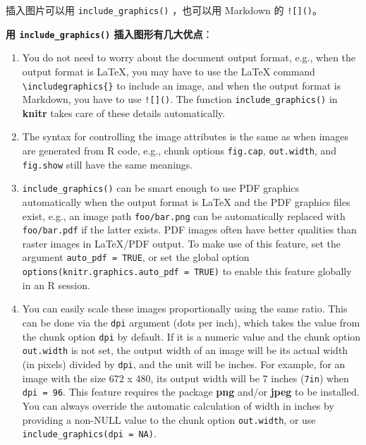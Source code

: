 \documentclass[]{article}
\providecommand{\tightlist}{%
  \setlength{\itemsep}{0pt}\setlength{\parskip}{0pt}}
\begin{document}
插入图片可以用 \texttt{include\_graphics()} ，也可以用 Markdown 的
\texttt{!{[}{]}()}。

\textbf{用 \texttt{include\_graphics()} 插入图形有几大优点}：

\begin{enumerate}
\def\labelenumi{\arabic{enumi}.}
\tightlist
\item
  You do not need to worry about the document output format, e.g., when
  the output format is LaTeX, you may have to use the LaTeX command
  \texttt{\textbackslash{}includegraphics\{\}} to include an image, and
  when the output format is Markdown, you have to use
  \texttt{!{[}{]}()}. The function \texttt{include\_graphics()} in
  \textbf{knitr} takes care of these details automatically.
\item
  The syntax for controlling the image attributes is the same as when
  images are generated from R code, e.g., chunk options
  \texttt{fig.cap}, \texttt{out.width}, and \texttt{fig.show} still have
  the same meanings.
\item
  \texttt{include\_graphics()} can be smart enough to use PDF graphics
  automatically when the output format is LaTeX and the PDF graphics
  files exist, e.g., an image path \texttt{foo/bar.png} can be
  automatically replaced with \texttt{foo/bar.pdf} if the latter exists.
  PDF images often have better qualities than raster images in LaTeX/PDF
  output. To make use of this feature, set the argument
  \texttt{auto\_pdf\ =\ TRUE}, or set the global option
  \texttt{options(knitr.graphics.auto\_pdf\ =\ TRUE)} to enable this
  feature globally in an R session.
\item
  You can easily scale these images proportionally using the same ratio.
  This can be done via the \texttt{dpi} argument (dots per inch), which
  takes the value from the chunk option \texttt{dpi} by default. If it
  is a numeric value and the chunk option \texttt{out.width} is not set,
  the output width of an image will be its actual width (in pixels)
  divided by \texttt{dpi}, and the unit will be inches. For example, for
  an image with the size 672 x 480, its output width will be 7 inches
  (\texttt{7in}) when \texttt{dpi\ =\ 96}. This feature requires the
  package \textbf{png} and/or \textbf{jpeg} to be installed. You can
  always override the automatic calculation of width in inches by
  providing a non-NULL value to the chunk option \texttt{out.width}, or
  use \texttt{include\_graphics(dpi\ =\ NA)}.
\end{enumerate}
\end{document}
